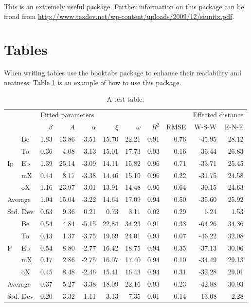 This is an extremely useful package. Further information on this package can be frond from \url{http://www.texdev.net/wp-content/uploads/2009/12/siunitx.pdf}. 

\section{Tables}

When writing tables use the booktabs package to enhance their readability and neatness. Table \ref{tab:ex} is an example of how to use this package.

\begin{table}[h!]
\centering
\small
\caption{A test table.}
\begin{tabular}{llrrrrrrrrr}
\toprule
& & \multicolumn{5}{l}{Fitted parameters} & &  & \multicolumn{ 2}{l}{Effected distance} \\ \cmidrule(r){3-7} \cmidrule(r){10-11}
 & & $\beta$ & $A$ & $\alpha$ & $\xi$ & $\omega$ & $R^2$ & RMSE & W-S-W & E-N-E \\ \midrule
\multirow{5}{*}{Ip} & Be & 1.83 & 13.86 & -3.51 & 15.70 & 22.21 & 0.91 & 0.76 & -45.95 & 28.12 \\ 
 & To & 0.36 & 4.08 & -3.13 & 15.01 & 17.73 & 0.93 & 0.16 & -36.44 & 26.83 \\ 
 & Eb & 1.39 & 25.14 & -3.09 & 14.11 & 15.82 & 0.96 & 0.71 & -33.71 & 25.45 \\ 
 & mX & 0.44 & 8.17 & -3.38 & 14.46 & 15.19 & 0.96 & 0.22 & -31.75 & 24.58 \\ 
 & oX & 1.16 & 23.97 & -3.01 & 13.91 & 14.48 & 0.96 & 0.64 & -30.15 & 24.63 \\ \midrule
\multicolumn{2}{l}{Average} & 1.04 & 15.04 & -3.22 & 14.64 & 17.09 & 0.94 & 0.50 & -35.60 & 25.92 \\ 
\multicolumn{2}{l}{Std. Dev} & 0.63 & 9.36 & 0.21 & 0.73 & 3.11 & 0.02 & 0.29 & 6.24 & 1.53 \\ \cmidrule[\heavyrulewidth]{1-11}
\multirow{5}{*}{P} & Be & 0.54 & 4.84 & -5.15 & 22.84 & 34.23 & 0.91 & 0.33 & -64.26 & 34.36 \\ 
 & To & 0.13 & 1.37 & -3.75 & 19.69 & 24.01 & 0.93 & 0.07 & -46.22 & 32.08 \\ 
 & Eb & 0.54 & 8.80 & -2.77 & 16.42 & 18.75 & 0.94 & 0.35 & -37.13 & 30.06 \\ 
 & mX & 0.17 & 2.86 & -2.75 & 16.07 & 17.40 & 0.94 & 0.10 & -34.49 & 29.13 \\ 
 & oX & 0.45 & 8.48 & -2.46 & 15.41 & 16.43 & 0.94 & 0.31 & -32.28 & 29.01 \\ \midrule
\multicolumn{2}{l}{Average}  & 0.37 & 5.27 & -3.38 & 18.09 & 22.16 & 0.93 & 0.23 & -42.88 & 30.93 \\ 
\multicolumn{2}{l}{Std. Dev} & 0.20 & 3.32 & 1.11 & 3.13 & 7.35 & 0.01 & 0.14 & 13.08 & 2.28 \\ \bottomrule
\end{tabular}
\label{tab:ex}
\end{table}

